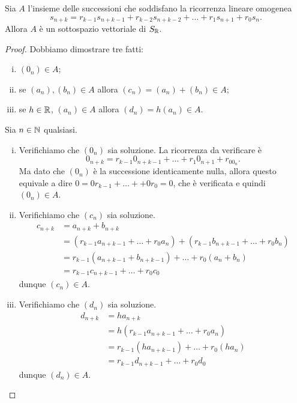 \begin{proposition}
    Sia $A$ l'insieme delle successioni che soddisfano la ricorrenza lineare omogenea \[
        s_{n+k} = r_{k-1}s_{n+k-1} + r_{k-2}s_{n+k-2} + \dots + r_{1}s_{n+1} + r_0s_n.
    \] Allora $A$ è un sottospazio vettoriale di $S_{\mathbb{R}}$.
\end{proposition}
\begin{proof}
    Dobbiamo dimostrare tre fatti:
    \begin{enumerate}[(i)]
        \item $(0_n) \in A$;
        \item se $(a_n), (b_n) \in A$ allora $(c_n) = (a_n) + (b_n) \in A$;
        \item se $h \in \mathbb{R}$, $(a_n) \in A$ allora $(d_n) = h(a_n) \in A$.
    \end{enumerate}

    Sia $n \in \mathbb{N}$ qualsiasi.
    \begin{enumerate}[(i)]
        \item Verifichiamo che $(0_n)$ sia soluzione. La ricorrenza da verificare è \[
            0_{n+k} = r_{k-1}0_{n+k-1} + \dots + r_{1}0_{n+1} + r_00_n.
        \] Ma dato che $(0_n)$ è la successione identicamente nulla, allora questo equivale a dire $0 = 0r_{k-1} + \dots +  + 0r_0 = 0$, che è verificata e quindi $(0_n) \in A$.
        \item Verifichiamo che $(c_n)$ sia soluzione. \begin{align*}
            c_{n+k} &= a_{n+k} + b_{n+k}\\
            &= (r_{k-1}a_{n+k-1} + \dots + r_0a_n) + (r_{k-1}b_{n+k-1} + \dots + r_0b_n) \\
            &= r_{k-1}(a_{n+k-1} + b_{n+k-1}) + \dots + r_0(a_n + b_n) \\
            &= r_{k-1}c_{n+k-1} + \dots + r_0c_0
        \end{align*}
        dunque $(c_n) \in A$.
        \item Verifichiamo che $(d_n)$ sia soluzione. \begin{align*}
            d_{n+k} &= ha_{n+k}\\
            &= h(r_{k-1}a_{n+k-1} + \dots + r_0a_n)\\
            &= r_{k-1}(ha_{n+k-1}) + \dots + r_0(ha_n) \\
            &= r_{k-1}d_{n+k-1} + \dots + r_0d_0
        \end{align*}
        dunque $(d_n) \in A$. \qedhere
    \end{enumerate}
\end{proof}

